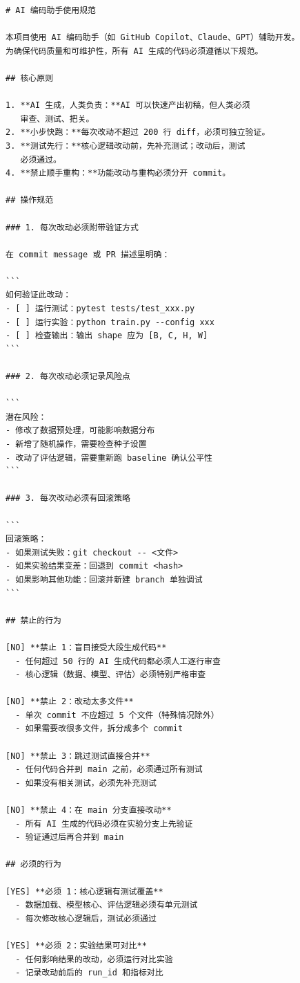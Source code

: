 \begin{verbatim}
# AI 编码助手使用规范

本项目使用 AI 编码助手（如 GitHub Copilot、Claude、GPT）辅助开发。
为确保代码质量和可维护性，所有 AI 生成的代码必须遵循以下规范。

## 核心原则

1. **AI 生成，人类负责：**AI 可以快速产出初稿，但人类必须
   审查、测试、把关。
2. **小步快跑：**每次改动不超过 200 行 diff，必须可独立验证。
3. **测试先行：**核心逻辑改动前，先补充测试；改动后，测试
   必须通过。
4. **禁止顺手重构：**功能改动与重构必须分开 commit。

## 操作规范

### 1. 每次改动必须附带验证方式

在 commit message 或 PR 描述里明确：

```
如何验证此改动：
- [ ] 运行测试：pytest tests/test_xxx.py
- [ ] 运行实验：python train.py --config xxx
- [ ] 检查输出：输出 shape 应为 [B, C, H, W]
```

### 2. 每次改动必须记录风险点

```
潜在风险：
- 修改了数据预处理，可能影响数据分布
- 新增了随机操作，需要检查种子设置
- 改动了评估逻辑，需要重新跑 baseline 确认公平性
```

### 3. 每次改动必须有回滚策略

```
回滚策略：
- 如果测试失败：git checkout -- <文件>
- 如果实验结果变差：回退到 commit <hash>
- 如果影响其他功能：回滚并新建 branch 单独调试
```

## 禁止的行为

[NO] **禁止 1：盲目接受大段生成代码**
  - 任何超过 50 行的 AI 生成代码都必须人工逐行审查
  - 核心逻辑（数据、模型、评估）必须特别严格审查

[NO] **禁止 2：改动太多文件**
  - 单次 commit 不应超过 5 个文件（特殊情况除外）
  - 如果需要改很多文件，拆分成多个 commit

[NO] **禁止 3：跳过测试直接合并**
  - 任何代码合并到 main 之前，必须通过所有测试
  - 如果没有相关测试，必须先补充测试

[NO] **禁止 4：在 main 分支直接改动**
  - 所有 AI 生成的代码必须在实验分支上先验证
  - 验证通过后再合并到 main

## 必须的行为

[YES] **必须 1：核心逻辑有测试覆盖**
  - 数据加载、模型核心、评估逻辑必须有单元测试
  - 每次修改核心逻辑后，测试必须通过

[YES] **必须 2：实验结果可对比**
  - 任何影响结果的改动，必须运行对比实验
  - 记录改动前后的 run_id 和指标对比


\end{verbatim}

